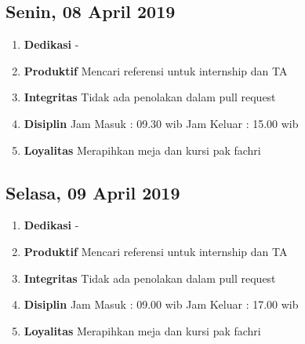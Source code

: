 \subsection{Senin, 08 April 2019}
\begin{enumerate}
\item \textbf{Dedikasi}
\subitem -
\item \textbf{Produktif}
\subitem Mencari referensi untuk internship dan TA
\item \textbf{Integritas}
\subitem Tidak ada penolakan dalam pull request
\item \textbf{Disiplin}
\subitem Jam Masuk : 09.30 wib
\subitem Jam Keluar : 15.00 wib
\item \textbf{Loyalitas}
\subitem Merapihkan meja dan kursi pak fachri
\end{enumerate}

\subsection{Selasa, 09 April 2019}
\begin{enumerate}
\item \textbf{Dedikasi}
\subitem -
\item \textbf{Produktif}
\subitem Mencari referensi untuk internship dan TA
\item \textbf{Integritas}
\subitem Tidak ada penolakan dalam pull request
\item \textbf{Disiplin}
\subitem Jam Masuk : 09.00 wib
\subitem Jam Keluar : 17.00 wib
\item \textbf{Loyalitas}
\subitem Merapihkan meja dan kursi pak fachri
\end{enumerate}